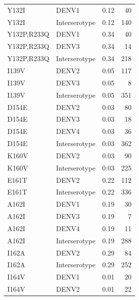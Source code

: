 \documentclass[11pt,oneside,letterpaper]{article}
\begin{document}
\begin{centering}
\begin{table}[ht]
{\begin{tabular}{llrr}
                           Y132I &          DENV1 &  0.12 &     40 \\
                           Y132I &  Interserotype &  0.12 &    140 \\
                     Y132P,R233Q &          DENV1 &  0.34 &     40 \\
                     Y132P,R233Q &          DENV3 &  0.34 &     14 \\
                     Y132P,R233Q &  Interserotype &  0.34 &    218 \\
                           I139V &          DENV2 &  0.05 &    117 \\
                           I139V &          DENV3 &  0.05 &      8 \\
                           I139V &  Interserotype &  0.05 &    351 \\
                           D154E &          DENV2 &  0.03 &     80 \\
                           D154E &          DENV3 &  0.03 &     18 \\
                           D154E &          DENV4 &  0.03 &     36 \\
                           D154E &  Interserotype &  0.03 &    362 \\
                           K160V &          DENV2 &  0.03 &     90 \\
                           K160V &  Interserotype &  0.03 &    225 \\
                           E161T &          DENV2 &  0.22 &    112 \\
                           E161T &  Interserotype &  0.22 &    336 \\
                           A162I &          DENV1 &  0.19 &     30 \\
                           A162I &          DENV3 &  0.19 &      7 \\
                           A162I &          DENV4 &  0.19 &     11 \\
                           A162I &  Interserotype &  0.19 &    288 \\
                           I162A &          DENV2 &  0.29 &     84 \\
                           I162A &  Interserotype &  0.29 &    252 \\
                           I164V &          DENV1 &  0.01 &     20 \\
                           I164V &          DENV2 &  0.01 &     22 \\

\end{tabular}}
\end{table}
\end{centering}
\end{document}
